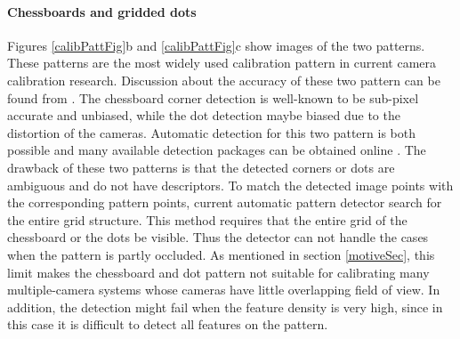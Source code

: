 \documentclass{report}
\begin{document}
\paragraph{Chessboards and gridded dots} Figures \ref{calibPattFig}b and \ref{calibPattFig}c show images of the two patterns. These patterns are the most widely used calibration pattern in current camera calibration research. Discussion about the accuracy of these two pattern can be found from \cite{mallon2007pattern}. The chessboard corner detection is well-known to be sub-pixel accurate and unbiased, while the dot detection maybe biased due to the distortion of the cameras. Automatic detection for this two pattern is both possible and many available detection packages can be obtained online \cite{opencv_library, rufli2008automatic, geiger2012automatic}. 
	The drawback of these two patterns is that the detected corners or dots are ambiguous and do not have descriptors. To match the detected image points with the corresponding pattern points, current automatic pattern detector search for the entire grid structure. This method requires that the entire grid of the chessboard or the dots be visible. Thus the detector can not handle the cases when the pattern is partly occluded. As mentioned in section \ref{motiveSec}, this limit makes the chessboard and dot pattern not suitable for calibrating many multiple-camera systems whose cameras have little overlapping field of view. In addition, the detection might fail when the feature density is very high, since in this case it is difficult to detect all features on the pattern. 
\end{document}
